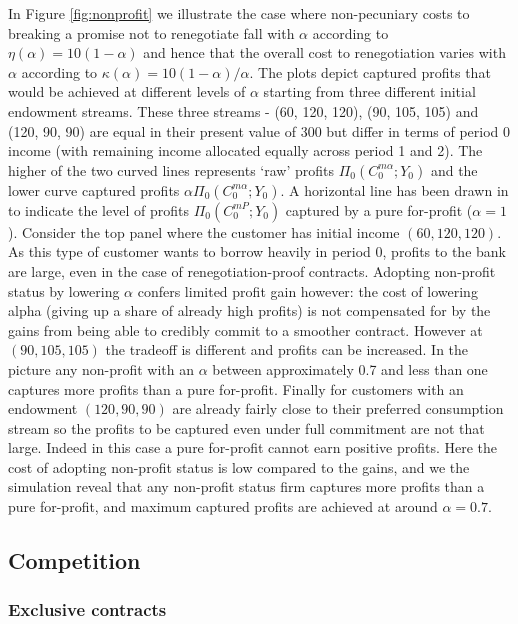 \documentclass[11pt,english]{article}
\theoremstyle{plain}
\theoremstyle{definition}
\begin{document}
In Figure \ref{fig:nonprofit} we illustrate the case where
non-pecuniary costs to breaking a promise not to renegotiate fall
with $\alpha$ according to $\eta(\alpha)=10(1-\alpha)$ and hence
that the overall cost to renegotiation varies with $\alpha$ according
to $\kappa(\alpha)=10(1-\alpha)/\alpha$. The plots depict captured
profits that would be achieved at different levels of $\alpha$ starting
from three different initial endowment streams. These three streams
- (60, 120, 120), (90, 105, 105) and (120, 90, 90) \textendash{} are
equal in their present value of 300 but differ in terms of period
0 income (with remaining income allocated equally across period 1
and 2). The higher of the two curved lines represents `raw' profits
$\Pi_{0}(C_{0}^{m\alpha};Y_{0})$ and the lower curve captured profits
$\alpha\Pi_{0}(C_{0}^{m\alpha};Y_{0})$. A horizontal line has been
drawn in to indicate the level of profits $\Pi_{0}(C_{0}^{mP};Y_{0})$
captured by a pure for-profit ($\alpha=1$). Consider the top panel
where the customer has initial income $(60,120,120)$. As this type
of customer wants to borrow heavily in period 0, profits to the bank
are large, even in the case of renegotiation-proof contracts. Adopting
non-profit status by lowering $\alpha$ confers limited profit gain
however: the cost of lowering alpha (giving up a share of already
high profits) is not compensated for by the gains from being able
to credibly commit to a smoother contract. However at $(90,105,105)$
the tradeoff is different and profits can be increased. In the picture
any non-profit with an $\alpha$ between approximately 0.7 and less
than one captures more profits than a pure for-profit. Finally for
customers with an endowment $(120,90,90)$ are already fairly close
to their preferred consumption stream so the profits to be captured
even under full commitment are not that large. Indeed in this case
a pure for-profit cannot earn positive profits. Here the cost of adopting
non-profit status is low compared to the gains, and we the simulation
reveal that any non-profit status firm captures more profits than
a pure for-profit, and maximum captured profits are achieved at around
$\alpha=0.7$.

\subsection{Competition}

\subsubsection{Exclusive contracts}
\end{document}
